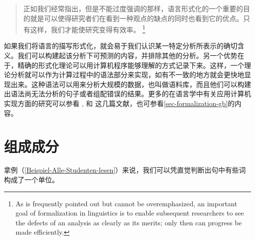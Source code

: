 \begin{quotation}
正如我们经常指出，但是不能过度强调的那样，语言形式化的一个重要的目的就是可以使得研究者们在看到一种观点的缺点的同时也看到它的优点。只有这样，我们才能使研究变得有效率。
\citep[]{Dowty79a}\footnote{%
As is frequently pointed out but cannot be overemphasized, an important goal
of formalization in linguistics is to enable subsequent researchers to see the defects
of an analysis as clearly as its merits; only then can progress be made efficiently.}
\end{quotation}
%
如果我们将语言的描写形式化，就会易于我们认识某一特定分析所表示的确切含义。我们可以构建起该分析下可预测的内容，并排除其他的分析。另一个优势在于，精确的形式化理论可以用计算机程序能够理解的方式记录下来。这样，一个理论分析就可以作为计算过程中的语法部分来实现，如有不一致的地方就会更快地显现出来。这种语法可以用来分析大规模的数据，也叫做语料库，而且他们可以构建出语法尚无法分析的句子或者组配错误的结果。更多的在语言学中有关应用计算机实现方面的研究可以参看 ,   和  这几篇文献，也可参看\ref{sec-formalization-gb}的内容。

\section{组成成分}
\label{konstituententests}\label{sec-constituents}

拿例（\ref{Beispiel-Alle-Studenten-lesen}）来说，我们可以凭直觉判断出句中有些词构成了一个单位。

